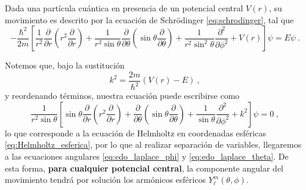 \begin{ejemplo}
    Dada una partícula cuántica en presencia de un potencial central $V(r)$, su movimiento es descrito por la ecuación de Schrödinger \eqref{eq:schrodinger}, tal que
    \begin{equation*}
        - \frac{\hbar^2}{2m} \left[ \frac{1}{r^2} \frac{\partial}{\partial r} \left( r^2 \frac{\partial}{\partial r} \right) + \frac{1}{r^2 \sin\theta} \frac{\partial}{\partial \theta} \left( \sin \theta \frac{\partial}{\partial \theta} \right) + \frac{1}{r^2 \sin^2\theta} \frac{\partial^2}{\partial \phi^2} + V(r) \right]  \psi = E \psi \ .
    \end{equation*}

    Notemos que, bajo la sustitución
    \begin{equation*}
        k^2 = \frac{2m}{\hbar^2} (V(r) - E) \ ,
    \end{equation*} 
    y reordenando términos, nuestra ecuación puede escribirse como
    \begin{equation*}
        \frac{1}{r^2 \sin\theta} \left[ \sin\theta \frac{\partial}{\partial r} \left( r^2 \frac{\partial}{\partial r} \right) + \frac{\partial}{\partial \theta} \left( \sin \theta \frac{\partial}{\partial \theta} \right) + \frac{1}{\sin\theta} \frac{\partial^2}{\partial \phi^2} + k^2 \right] \psi = 0 \ ,
    \end{equation*}
    lo que corresponde a la ecuación de Helmholtz en coordenadas esféricas \eqref{eq:Helmholtz_esferica}, por lo que al realizar separación de variables, llegaremos a las ecuaciones angulares \eqref{eq:edo_laplace_phi} y \eqref{eq:edo_laplace_theta}. De esta forma, \textbf{para cualquier potencial central}, la componente angular del movimiento tendrá por solución los armónicos esféricos $Y_\ell^m(\theta, \phi)$.
\end{ejemplo}

